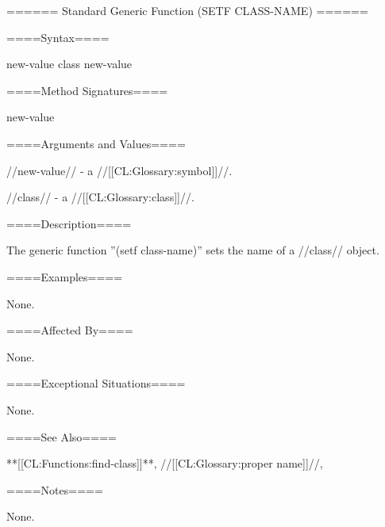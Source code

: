 ====== Standard Generic Function (SETF CLASS-NAME) ======

====Syntax====

 {new-value class} {new-value}

====Method Signatures====

 {new-value }

====Arguments and Values====

//new-value// - a //[[CL:Glossary:symbol]]//.

//class// - a //[[CL:Glossary:class]]//.

====Description====

The generic function ''(setf class-name)'' sets the name of a //class// object.



====Examples====

None.

====Affected By====

None.

====Exceptional Situations====

None.

====See Also====

**[[CL:Functions:find-class]]**, //[[CL:Glossary:proper name]]//, {\secref\Classes}

====Notes====

None.




